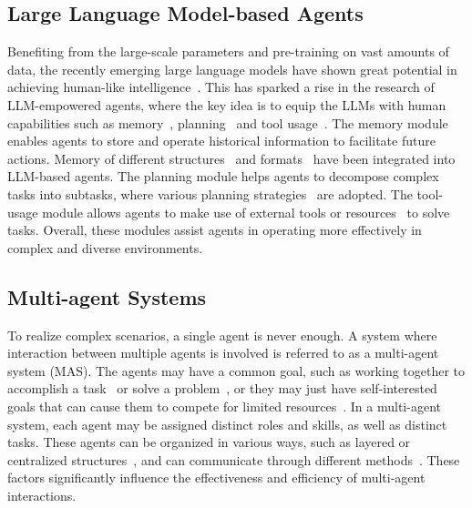 \subsection{Large Language Model-based Agents}
Benefiting from the large-scale parameters and pre-training on vast amounts of data, the recently emerging large language models have shown great potential in achieving human-like intelligence~\cite{brown2020language,kojima2022large,achiam2023gpt}. This has sparked a rise in the research of LLM-empowered agents, where the key idea is to equip the LLMs with human capabilities such as memory~\cite{fischer2023reflective,wang2023user}, planning~\cite{yao2022react,hao2023reasoning} and tool usage~\cite{parisi2022talm,schick2024toolformer}. The memory module enables agents to store and operate historical information to facilitate future actions. Memory of different structures~\cite{park2023generative,shinn2024reflexion} and formats~\cite{hu2023chatdb,zhong2024memorybank} have been integrated into LLM-based agents. The planning module helps agents to decompose complex tasks into subtasks, where various planning strategies~\cite{wei2022chain,yao2022react} are adopted. The tool-usage module allows agents to make use of external tools or resources~\cite{yao2022react,ruan2023tptu} to solve tasks. Overall, these modules assist agents in operating more effectively in complex and diverse environments.

\subsection{Multi-agent Systems}
To realize complex scenarios, a single agent is never enough. A system where interaction between multiple agents is involved is referred to as a multi-agent system (MAS). The agents may have a common goal, such as working together to accomplish a task~\cite{qian2023communicative,hong2023metagpt} or solve a problem~\cite{du2023improving}, or they may just have self-interested goals that can cause them to compete for limited resources~\cite{hua2023war}. In a multi-agent system, each agent may be assigned distinct roles and skills, as well as distinct tasks. These agents can be organized in various ways, such as layered or centralized structures~\cite{qian2024scaling,hao2023chatllm,li2024culturepark}, and can communicate through different methods~\cite{chen2024beyond,phamlet,marro2024scalable}. These factors significantly influence the effectiveness and efficiency of multi-agent interactions.







